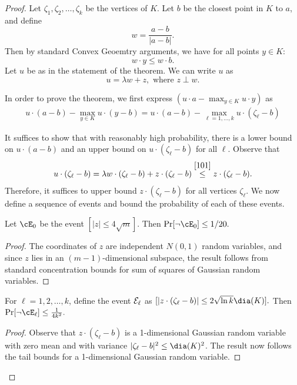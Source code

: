 \begin{proof}
 Let $\zeta_1,\zeta_2,\ldots ,\zeta_k$ be the vertices of $K$. Let $b$ be the closest point in $K$ to $a$, and define 
$$w=\frac{a-b}{|a-b|}.$$
Then by standard Convex Geoemtry arguments, we have for all points $y \in K$:
\begin{equation}\label{101}
w\cdot y\leq w\cdot b.
\end{equation}
Let $u$ be as in the statement of the theorem. 
We can write $u$ as 
$$u=\lambda w+z, \mbox{ where }z\perp w.$$

In order to prove the theorem, we first express $(u \cdot a  - \max_{y \in K} u \cdot y)$ as 
\begin{align}
\label{eq:step1}
u \cdot (a-b) - \max_{y \in K} u \cdot (y-b)  =  u \cdot (a-b) - \max_{\ell = 1, \ldots, k} u \cdot (\zeta_\ell-b)
\end{align}

It suffices to show that with reasonably high probability, there is a lower bound on $u \cdot (a-b)$ and an upper bound on $u \cdot (\zeta_\ell-b)$ for all $\ell$. Observe that 
\begin{align}
\label{eq:step2}
u \cdot (\zeta_\ell-b) = \lambda w \cdot (\zeta_\ell-b) + z \cdot (\zeta_\ell-b) \stackrel{\eqref{101}}{\leq} z \cdot (\zeta_\ell-b).
\end{align}
Therefore, it suffices to upper bound $z \cdot (\zeta_\ell - b)$ for all vertices $\zeta_\ell$. We now define a sequence of events and bound the probability of each of these events. 

\begin{fact}
\label{fact:1}
Let $\cE_0$ be the event $[|z| \leq 4 \sqrt{m}]$. Then $\Pr[\neg \cE_0] \leq 1/20. $
\end{fact}
\begin{proof}
The coordinates of $z$ are independent $N(0,1)$ random variables, and since $z$ lies in an $(m-1)$-dimensional subspace, the result follows from standard concentration bounds for sum of squares of Gaussian random variables. 
\end{proof}

\begin{fact}
\label{fact:2}
For $\ell=1,2,\ldots , k$, define the  event
${\cal E}_\ell$ as $[\left| z\cdot (\zeta_\ell-b)\right|\leq 2\sqrt{\ln k} \dia(K)].$ Then $\Pr[\neg \cE_\ell] \leq \frac{1}{4k^2}.$
\end{fact}
\begin{proof}
Observe that $z \cdot (\zeta_\ell - b)$ is a 1-dimensional Gaussian random variable with zero mean and  with variance $|\zeta_\ell - b|^2 \leq \dia(K)^2$. The result now follows the tail bounds for a 1-dimensional Gaussian random variable. 
\end{proof}


\end{proof}
